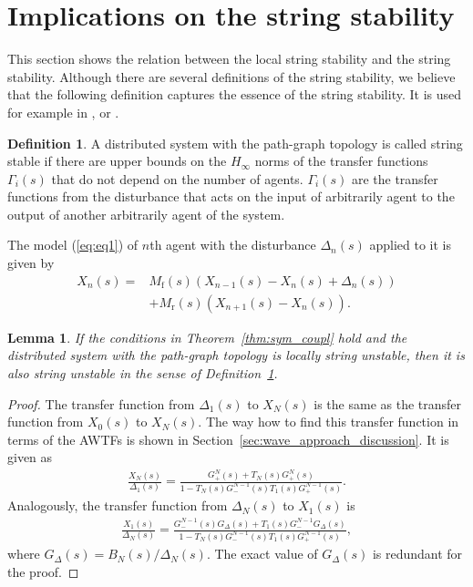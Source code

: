 \documentclass[10pt,twocolumn,twoside]{IEEEtran}
\newtheorem{lemma}{Lemma}
\theoremstyle{definition}
\newtheorem{defn}{Definition}
\newcommand{\revA}{Black}
\begin{document}
{\color{\revA}
\section{Implications on the string stability}

This section shows the relation between the local string stability and the string stability. Although there are several definitions of the string stability, we believe that the following definition captures the essence of the string stability. It is used for example in \cite{Ploeg2014}, \cite{Seiler2004a} or \cite{Eyre1998a}.
\begin{defn} \label{def:string_stability_classic}
  A distributed system with the path-graph topology is called string stable if there are upper bounds on the $H_{\infty}$ norms of the transfer functions $\Gamma_i(s)$ that do not depend on the number of agents. $\Gamma_i(s)$ are the transfer functions from the disturbance that acts on the input of arbitrarily agent to the output of another arbitrarily agent of the system.
\end{defn}



The model (\ref{eq:eq1}) of $n$th agent with the disturbance $\Delta_n(s)$ applied to it is given by
\begin{align}
    X_{n}(s) = &M_{\text{f}}(s)(X_{n-1}(s)-X_{n}(s)+\Delta_n(s)) \nonumber\\
  &+ M_{\text{r}}(s)(X_{n+1}(s)-X_{n}(s)).\label{eq:eq_disturbance_n}
\end{align}






\begin{lemma}\label{lemma:connection_to_string_stability}
  If the conditions in Theorem~\ref{thm:sym_coupl} hold and the distributed system with the path-graph topology is locally string unstable, then it is also string unstable in the sense of Definition~\ref{def:string_stability_classic}.
\end{lemma}
\begin{proof}
The transfer function from $\Delta_1(s)$ to $X_N(s)$ is the same as the transfer function from $X_0(s)$ to $X_N(s)$. The way how to find this transfer function in terms of the AWTFs is shown in Section~\ref{sec:wave_approach_discussion}. It is given as
  \begin{align}
   \frac{X_N(s)}{\Delta_1(s)} = \frac{G_+^{N}(s) + T_N(s)G_+^{N}(s)}{1-T_N(s)G_-^{N-1}(s)T_1(s)G_+^{N-1}(s)}.\label{eq:proof_tf_dist_1}
\end{align}
Analogously, the transfer function from $\Delta_N(s)$ to $X_1(s)$ is
\begin{align}
   \frac{X_1(s)}{\Delta_N(s)} = \frac{G_-^{N-1}(s)G_{\Delta}(s) + T_1(s)G_-^{N-1}G_{\Delta}(s)}{1-T_N(s)G_-^{N-1}(s)T_1(s)G_+^{N-1}(s)},\label{eq:proof_tf_dist_2}
\end{align}
where $G_{\Delta}(s) = B_N(s)/\Delta_N(s)$. The exact value of $G_{\Delta}(s)$ is redundant for the proof.


\end{proof}}
\end{document}
